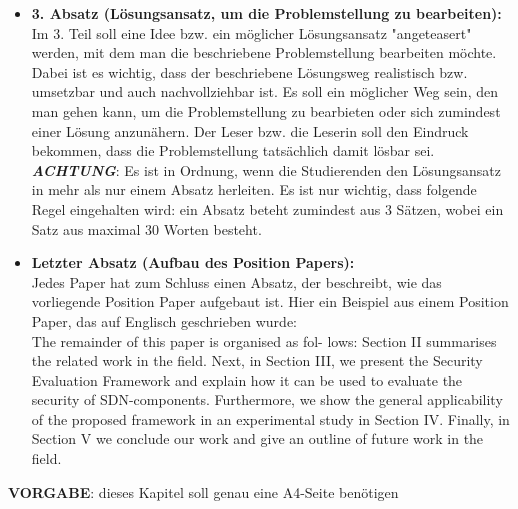 \begin{itemize}
	\item\textbf{3. Absatz (Lösungsansatz, um die Problemstellung zu bearbeiten): } \\
	Im 3. Teil soll eine Idee bzw. ein möglicher Lösungsansatz "angeteasert" werden, mit dem man die beschriebene Problemstellung bearbeiten möchte. Dabei ist es wichtig, dass der beschriebene Lösungsweg realistisch bzw. umsetzbar und auch nachvollziehbar ist. Es soll ein möglicher Weg sein, den man gehen kann, um die Problemstellung zu bearbieten oder sich zumindest einer Lösung anzunähern. Der Leser bzw. die Leserin soll den Eindruck bekommen, dass die Problemstellung tatsächlich damit lösbar sei. \\
	
	\textbf{\textit{ACHTUNG}}: Es ist in Ordnung, wenn die Studierenden den Lösungsansatz in mehr als nur einem Absatz herleiten. Es ist nur wichtig, dass folgende Regel eingehalten wird: ein Absatz beteht zumindest aus 3 Sätzen, wobei ein Satz aus maximal 30 Worten besteht.

	\item\textbf{Letzter Absatz (Aufbau des Position Papers): }\\
	Jedes Paper hat zum Schluss einen Absatz, der beschreibt, wie das vorliegende Position Paper aufgebaut ist. Hier ein Beispiel aus einem Position Paper, das auf Englisch geschrieben wurde: \\
	
	The remainder of this paper is organised as fol- lows: Section II summarises the related work in the field. Next, in Section III, we present the Security Evaluation Framework and explain how it can be used to evaluate the security of SDN-components. Furthermore, we show the general applicability of the proposed framework in an experimental study in Section IV. Finally, in Section V we conclude our work and give an outline of future work in the field.
	
\end{itemize}

\textbf{VORGABE}: dieses Kapitel soll genau eine A4-Seite benötigen